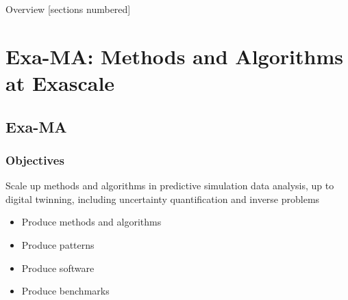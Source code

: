 \titleframe

\begin{frame}{Overview}
  [sections numbered]
  \tableofcontents[hideallsubsections]
\end{frame}


\section{Exa-MA: Methods and Algorithms at Exascale}

\subsection{Exa-MA}

\begin{frame}
  \frametitle{Objectives}

  \begin{center}
    \Large Scale up methods and algorithms in predictive simulation data analysis, up to digital twinning, including uncertainty quantification and inverse problems
  \end{center}

  \begin{itemize}
    \item Produce methods and algorithms 
    \item Produce patterns
    \item Produce software
    \item Produce benchmarks
  \end{itemize}
\end{frame}

